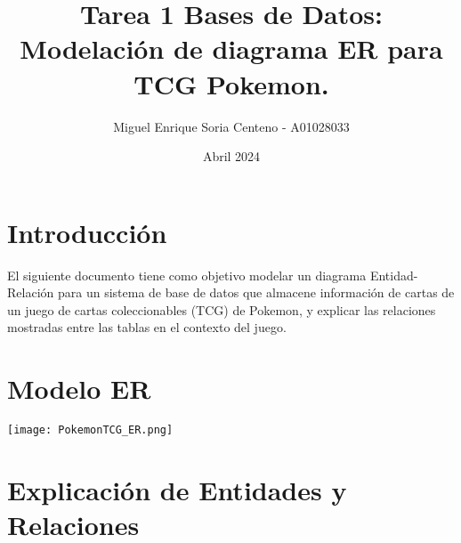 \documentclass{article}
\title{Tarea 1 Bases de Datos: Modelación de diagrama ER para TCG Pokemon.}
\author{Miguel Enrique Soria Centeno - A01028033}
\date{Abril 2024}
\begin{document}
\maketitle

\section{Introducción}
El siguiente documento tiene como objetivo modelar un diagrama Entidad-Relación para un sistema de base de datos que almacene información de cartas de un juego de cartas coleccionables (TCG) de Pokemon, y explicar las relaciones mostradas entre las tablas en el contexto del juego. 

\section{Modelo ER}
\begin{center}
  \texttt{[image: PokemonTCG\_ER.png]}
\end{center}

\section{Explicación de Entidades y Relaciones}
\end{document}
